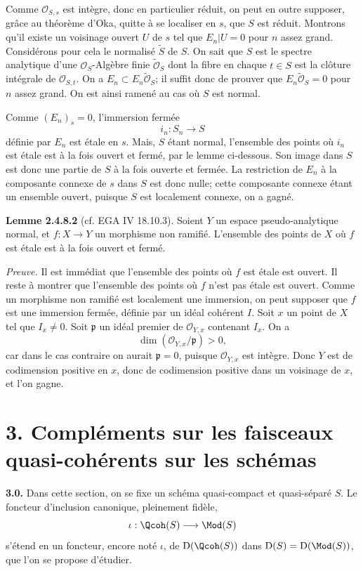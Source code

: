 \documentclass[11pt]{article}
\begin{document}
Comme $\mathcal O_{S,s}$ est intègre, donc en particulier réduit, on peut en outre supposer, grâce au théorème d'Oka, quitte à se localiser en $s$, que $S$ est réduit. Montrons qu'il existe un voisinage ouvert $U$ de $s$ tel que $E_n|U=0$ pour $n$ assez grand. Considérons pour cela le normalisé $\widetilde S$ de $S$. On sait que $S$ est le spectre analytique d'une $\mathcal O_S$-Algèbre finie $\widetilde{\mathcal O}_S$ dont la fibre en chaque $t\in S$ est la clôture intégrale de $\mathcal O_{S,t}$. On a $E_n\subset E_n\widetilde{\mathcal O}_S$; il suffit donc de prouver que $E_n\widetilde{\mathcal O}_S=0$ pour $n$ assez grand. On est ainsi ramené au cas où $S$ est normal.

Comme $(E_n)_s=0$, l'immersion fermée
\[
 i_n:S_n\longrightarrow S
\]
définie par $E_n$ est étale en $s$. Mais, $S$ étant normal, l'ensemble des points où $i_n$ est étale est à la fois ouvert et fermé, par le lemme ci-dessous. Son image dans $S$ est donc une partie de $S$ à la fois ouverte et fermée. La restriction de $E_n$ à la composante connexe de $s$ dans $S$ est donc nulle; cette composante connexe étant un ensemble ouvert, puisque $S$ est localement connexe, on a gagné.

\textbf{Lemme 2.4.8.2} (cf. EGA IV 18.10.3). Soient $Y$ un espace pseudo-analytique normal, et $f:X\to Y$ un morphisme non ramifié. L'ensemble des points de $X$ où $f$ est étale est à la fois ouvert et fermé.

\emph{Preuve.} Il est immédiat que l'ensemble des points où $f$ est étale est ouvert. Il reste à montrer que l'ensemble des points où $f$ n'est pas étale est ouvert. Comme un morphisme non ramifié est localement une immersion, on peut supposer que $f$ est une immersion fermée, définie par un idéal cohérent $I$. Soit $x$ un point de $X$ tel que $I_x\ne0$. Soit $\mathfrak p$ un idéal premier de $\mathcal O_{Y,x}$ contenant $I_x$. On a
\[
 \dim(\mathcal O_{Y,x}/\mathfrak p)>0,
\]
car dans le cas contraire on aurait $\mathfrak p=0$, puisque $\mathcal O_{Y,x}$ est intègre. Donc $Y$ est de codimension positive en $x$, donc de codimension positive dans un voisinage de $x$, et l'on gagne.

\section*{3. Compléments sur les faisceaux quasi-cohérents sur les schémas}

\textbf{3.0.} Dans cette section, on se fixe un schéma quasi-compact et quasi-séparé $S$. Le foncteur d'inclusion canonique, pleinement fidèle,
\[
 \iota:\Qcoh(S)\longrightarrow\Mod(S)
\]
s'étend en un foncteur, encore noté $\iota$, de $\mathrm D(\Qcoh(S))$ dans $\mathrm D(S)=\mathrm D(\Mod(S))$, que l'on se propose d'étudier.
\end{document}
